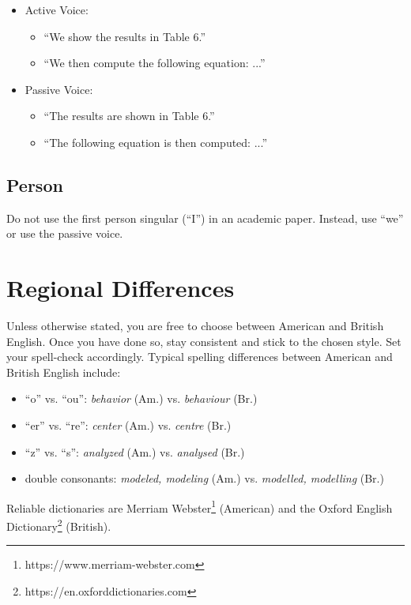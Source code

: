 \begin{itemize}
	\item Active Voice:
	      \begin{itemize}
		      \item ``We show the results in Table 6.''
		      \item ``We then compute the following equation: ...''
	      \end{itemize}
	\item Passive Voice:
	      \begin{itemize}
		      \item ``The results are shown in Table 6.''
		      \item ``The following equation is then computed: ...''
	      \end{itemize}
\end{itemize}

\subsection{Person}
Do not use the first person singular (``I'') in an academic paper.
Instead, use ``we'' or use the passive voice.

\section{Regional Differences}
Unless otherwise stated, you are free to choose between American and British English.
Once you have done so, stay consistent and stick to the chosen style.
Set your spell-check accordingly.
Typical spelling differences between American and British English include:

\begin{itemize}
	\item ``o'' vs. ``ou'': \textit{behavior} (Am.) vs. \textit{behaviour} (Br.)
	\item ``er'' vs. ``re'': \textit{center} (Am.) vs. \textit{centre} (Br.)
	\item ``z'' vs. ``s'': \textit{analyzed} (Am.) vs. \textit{analysed} (Br.)
	\item double consonants: \textit{modeled, modeling} (Am.) vs. \textit{modelled, modelling} (Br.)
\end{itemize}

Reliable dictionaries are Merriam Webster\footnote{https://www.merriam-webster.com} (American) and the Oxford English
Dictionary\footnote{https://en.oxforddictionaries.com} (British).

